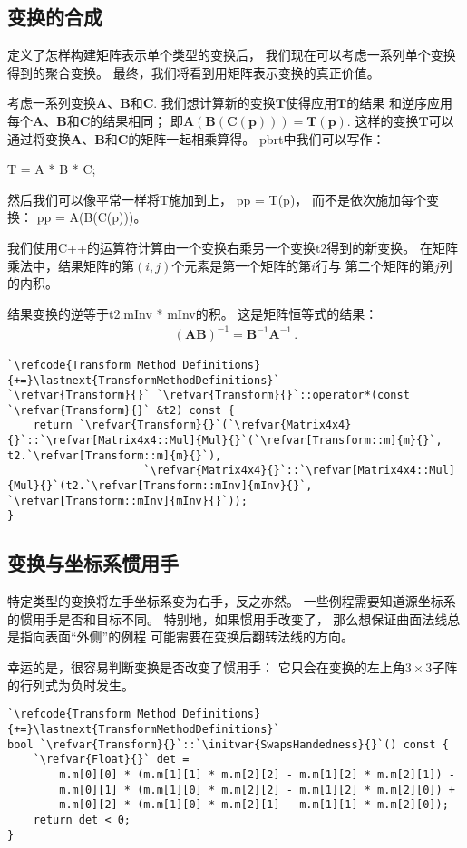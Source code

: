 \subsection{变换的合成}\label{sub:变换的合成}
定义了怎样构建矩阵表示单个类型的变换后，
我们现在可以考虑一系列单个变换得到的聚合变换。
最终，我们将看到用矩阵表示变换的真正价值。

考虑一系列变换$\bm A$、$\bm B$和$\bm C$.
我们想计算新的变换$\bm T$使得应用$\bm T$的结果
和逆序应用每个$\bm A$、$\bm B$和$\bm C$的结果相同；
即$\bm A(\bm B(\bm C(\bm p)))=\bm T(\bm p)$.
这样的变换$\bm T$可以通过将变换$\bm A$、$\bm B$和$\bm C$的矩阵一起相乘算得。
pbrt中我们可以写作：

{\ttfamily\indent {} T = A * B * C;}

然后我们可以像平常一样将{\ttfamily T}施加到上，
{\ttfamily{} pp = T(p)}，
而不是依次施加每个变换：{\ttfamily{} pp = A(B(C(p)))}。

我们使用C++的{\ttfamily *}运算符计算由一个变换右乘另一个变换{\ttfamily t2}得到的新变换。
在矩阵乘法中，结果矩阵的第$(i,j)$个元素是第一个矩阵的第$i$行与
第二个矩阵的第$j$列的内积。

结果变换的逆等于{\ttfamily t2.mInv * mInv}的积。
这是矩阵恒等式的结果：
\begin{align*}
    (\bm A\bm B)^{-1}=\bm B^{-1}\bm A^{-1}\, .
\end{align*}

\begin{lstlisting}
`\refcode{Transform Method Definitions}{+=}\lastnext{TransformMethodDefinitions}`
`\refvar{Transform}{}` `\refvar{Transform}{}`::operator*(const `\refvar{Transform}{}` &t2) const {
    return `\refvar{Transform}{}`(`\refvar{Matrix4x4}{}`::`\refvar[Matrix4x4::Mul]{Mul}{}`(`\refvar[Transform::m]{m}{}`, t2.`\refvar[Transform::m]{m}{}`),
                     `\refvar{Matrix4x4}{}`::`\refvar[Matrix4x4::Mul]{Mul}{}`(t2.`\refvar[Transform::mInv]{mInv}{}`, `\refvar[Transform::mInv]{mInv}{}`));
}
\end{lstlisting}

\subsection{变换与坐标系惯用手}\label{sub:变换与坐标系惯用手}
特定类型的变换将左手坐标系变为右手，反之亦然。
一些例程需要知道源坐标系的惯用手是否和目标不同。
特别地，如果惯用手改变了，
那么想保证曲面法线总是指向表面“外侧”的例程
可能需要在变换后翻转法线的方向。

幸运的是，很容易判断变换是否改变了惯用手：
它只会在变换的左上角$3\times3$子阵的行列式为负时发生。
\begin{lstlisting}
`\refcode{Transform Method Definitions}{+=}\lastnext{TransformMethodDefinitions}`
bool `\refvar{Transform}{}`::`\initvar{SwapsHandedness}{}`() const {
    `\refvar{Float}{}` det = 
        m.m[0][0] * (m.m[1][1] * m.m[2][2] - m.m[1][2] * m.m[2][1]) -
        m.m[0][1] * (m.m[1][0] * m.m[2][2] - m.m[1][2] * m.m[2][0]) +
        m.m[0][2] * (m.m[1][0] * m.m[2][1] - m.m[1][1] * m.m[2][0]);
    return det < 0;
}
\end{lstlisting}